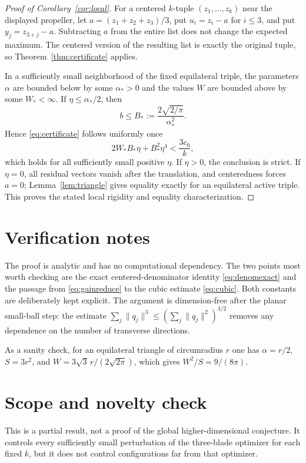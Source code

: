 \documentclass[11pt]{article}
\begin{document}
\begin{proof}[Proof of Corollary~\ref{cor:local}]
For a centered $k$-tuple $(z_1,\ldots,z_k)$ near the displayed propeller,
let $a=(z_1+z_2+z_3)/3$, put $u_i=z_i-a$ for $i\le3$, and put
$y_j=z_{3+j}-a$. Subtracting $a$ from the entire list does not change the
expected maximum. The centered version of the resulting list is exactly the
original tuple, so Theorem~\ref{thm:certificate} applies.

In a sufficiently small neighborhood of the fixed equilateral triple, the
parameters $\alpha$ are bounded below by some $\alpha_*>0$ and the values
$W$ are bounded above by some $W_*<\infty$. If $\eta\le\alpha_*/2$, then
\[
 b\le B_*:=\frac{2\sqrt{2/\pi}}{\alpha_*^2}.
\]
Hence \eqref{eq:certificate} follows uniformly once
\[
 2W_*B_*\eta+B_*^2\eta^4<\frac{3c_0}{k},
\]
which holds for all sufficiently small positive $\eta$. If $\eta>0$, the
conclusion is strict. If $\eta=0$, all residual vectors vanish after the
translation, and centeredness forces $a=0$; Lemma~\ref{lem:triangle} gives
equality exactly for an equilateral active triple. This proves the stated
local rigidity and equality characterization.
\end{proof}

\section*{Verification notes}

The proof is analytic and has no computational dependency. The two points
most worth checking are the exact centered-denominator identity
\eqref{eq:denomexact} and the passage from \eqref{eq:gainreduce} to the
cubic estimate \eqref{eq:cubic}. Both constants are deliberately kept
explicit. The argument is dimension-free after the planar small-ball step:
the estimate
$\sum_j\|q_j\|^3\le(\sum_j\|q_j\|^2)^{3/2}$ removes any dependence on the
number of transverse directions.

As a sanity check, for an equilateral triangle of circumradius $r$ one has
$\alpha=r/2$, $S=3r^2$, and
$W=3\sqrt3\,r/(2\sqrt{2\pi})$, which gives $W^2/S=9/(8\pi)$.

\section*{Scope and novelty check}

This is a partial result, not a proof of the global higher-dimensional
conjecture. It controls every sufficiently small perturbation of the
three-blade optimizer for each fixed $k$, but it does not control
configurations far from that optimizer.
\end{document}
